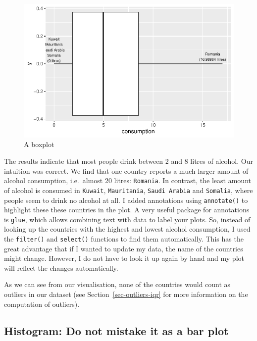 \documentclass[
  letterpaper,
]{krantz}
\begin{document}
\begin{figure}[H]

{\centering \includegraphics{08_descriptive_statistics_files/figure-pdf/a-boxplot-1.pdf}

}

\caption{A boxplot}

\end{figure}%

The results indicate that most people drink between 2 and 8 litres of
alcohol. Our intuition was correct. We find that one country reports a
much larger amount of alcohol consumption, i.e.~almost 20 litres:
\texttt{Romania}. In contrast, the least amount of alcohol is consumed
in \texttt{Kuwait}, \texttt{Mauritania}, \texttt{Saudi\ Arabia} and
\texttt{Somalia}, where people seem to drink no alcohol at all. I added
annotations using \texttt{annotate()} to highlight these these countries
in the plot. A very useful package for annotations is \texttt{glue},
which allows combining text with data to label your plots. So, instead
of looking up the countries with the highest and lowest alcohol
consumption, I used the \texttt{filter()} and \texttt{select()}
functions to find them automatically. This has the great advantage that
if I wanted to update my data, the name of the countries might change.
However, I do not have to look it up again by hand and my plot will
reflect the changes automatically.

As we can see from our visualisation, none of the countries would count
as outliers in our dataset (see Section~\ref{sec-outliers-iqr} for more
information on the computation of outliers).

\subsection{Histogram: Do not mistake it as a bar
plot}\label{sec-histograms}
\end{document}
